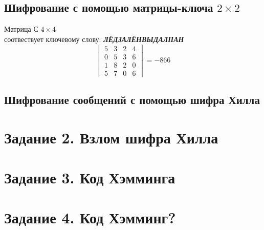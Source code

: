 \documentclass[a5paper, 10pt]{article}
\theoremstyle{definition}
\theoremstyle{plain}
\theoremstyle{remark}
\begin{document}
\subsection{Шифрование с помощью матрицы-ключа $2 \times 2$}
Матрица С $4 \times 4$  \\
соотвествует ключевому слову: \textbf{\textit{ЛЁДЗАЛЁНВЫДАЛПАН}}
\begin{equation}
\begin{vmatrix}
 5 & 3 & 2 & 4 \\
 0 & 5 & 3 & 6 \\
1& 8 & 2 & 0\\
 5 & 7 & 0 & 6
\end{vmatrix}
= -866
\end{equation}

\subsection{Шифрование сообщений с помощью шифра Хилла}



\section{Задание 2. Взлом шифра Хилла}	

\section{Задание 3. Код Хэмминга}

\section{Задание 4. Код Хэмминг?}
\end{document}
